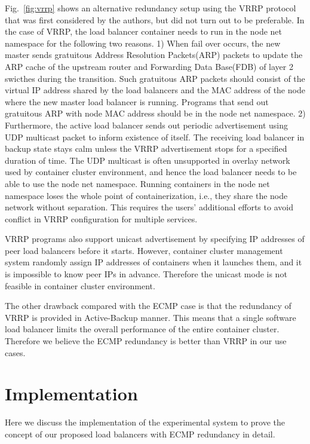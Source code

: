 Fig.~\ref{fig:vrrp} shows an alternative redundancy setup using the VRRP protocol that was first considered by the authors, but did not turn out to be preferable.
In the case of VRRP, the load balancer container needs to run in the node net namespace for the following two reasons.
1) When fail over occurs, the new master sends gratuitous Address Resolution Packets(ARP) packets to update the ARP cache of the upstream router and Forwarding Data Base(FDB) of layer 2 swicthes during the transition.
Such gratuitous ARP packets should consist of the virtual IP address shared by the load balancers and the MAC address of the node where the new master load balancer is running.
Programs that send out gratuitous ARP with node MAC address should be in the node net namespace.
%
2) Furthermore, the active load balancer sends out periodic advertisement using UDP multicast packet to inform existence of itself.
The receiving load balancer in backup state stays calm unless the VRRP advertisement stops for a specified duration of time.
The UDP multicast is often unsupported in overlay network used by container cluster environment, and hence the load balancer needs to be able to use the node net namespace.
%
Running containers in the node net namespace loses the whole point of containerization, i.e., they share the node network without separation.
This requires the users' additional efforts to avoid conflict in VRRP configuration for multiple services.
%

VRRP programs also support unicast advertisement by specifying IP addresses of peer load balancers before it starts.
However, container cluster management system randomly assign IP addresses of containers when it launches them, and it is impossible to know peer IPs in advance. 
Therefore the unicast mode is not feasible in container cluster environment.

The other drawback compared with the ECMP case is that the redundancy of VRRP is provided in Active-Backup manner.
This means that a single software load balancer limits the overall performance of the entire container cluster.
Therefore we believe the ECMP redundancy is better than VRRP in our use cases.

\section{Implementation}\label{Implementation}

Here we discuss the implementation of the experimental system to prove the concept of our proposed load balancers with ECMP redundancy in detail.

